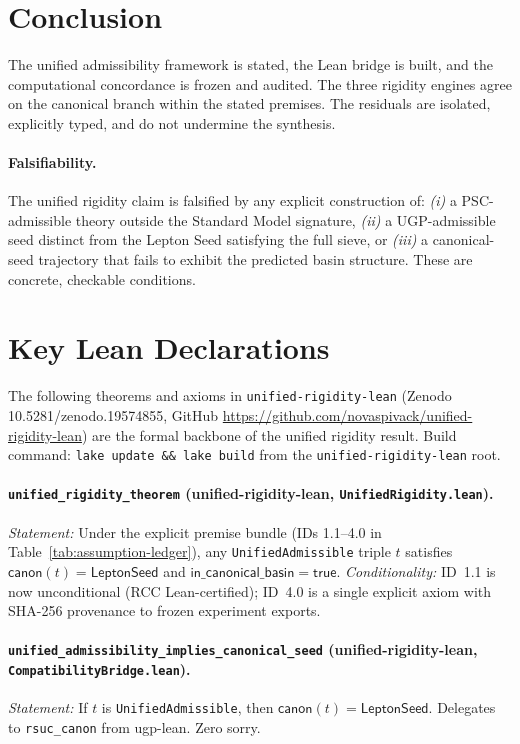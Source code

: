 \documentclass[11pt,twocolumn]{article}
\theoremstyle{remark}
\begin{document}
\section{Conclusion}
The unified admissibility framework is stated, the Lean bridge is built, and the computational
concordance is frozen and audited.
The three rigidity engines agree on the canonical branch within the stated premises.
The residuals are isolated, explicitly typed, and do not undermine the synthesis.

\paragraph{Falsifiability.}
The unified rigidity claim is falsified by any explicit construction of:
\emph{(i)} a PSC-admissible theory outside the Standard Model signature,
\emph{(ii)} a UGP-admissible seed distinct from the Lepton Seed satisfying the full sieve, or
\emph{(iii)} a canonical-seed trajectory that fails to exhibit the predicted basin structure.
These are concrete, checkable conditions.

\appendix
\section{Key Lean Declarations}
\label{app:lean}

The following theorems and axioms in \texttt{unified-rigidity-lean}
(Zenodo 10.5281/\allowbreak zenodo.19574855,
GitHub \url{https://github.com/novaspivack/unified-rigidity-lean})
are the formal backbone of the unified rigidity result.
Build command: \texttt{lake update \&\& lake build} from the
\texttt{unified-rigidity-lean} root.

\paragraph{\texttt{unified\_rigidity\_theorem}
(unified-rigidity-lean, \texttt{UnifiedRigidity.lean}).}
\textit{Statement:} Under the explicit premise bundle (IDs 1.1--4.0 in
Table~\ref{tab:assumption-ledger}), any \texttt{UnifiedAdmissible} triple
$t$ satisfies $\mathsf{canon}(t) = \mathsf{LeptonSeed}$ and
$\mathsf{in\_canonical\_basin} = \mathsf{true}$.
\textit{Conditionality:} ID~1.1 is now unconditional (RCC Lean-certified); ID~4.0 is a single
explicit axiom with SHA-256 provenance to frozen experiment exports.

\paragraph{\texttt{unified\_admissibility\_implies\_canonical\_seed}
(unified-rigidity-lean, \texttt{CompatibilityBridge.lean}).}
\textit{Statement:} If $t$ is \texttt{UnifiedAdmissible}, then
$\mathsf{canon}(t) = \mathsf{LeptonSeed}$.
Delegates to \texttt{rsuc\_canon} from ugp-lean. Zero sorry.
\end{document}
